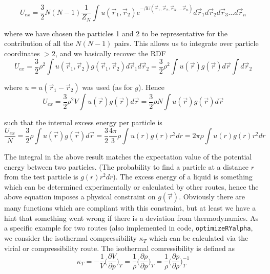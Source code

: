 \documentclass[11pt,a4paper]{article}
\begin{document}
\begin{equation}
U_{ex} = 
\frac{3}{2}
N(N-1) \frac{1}{Z_N}
\int u(\vec r_1, \vec r_2) 
e^{-\beta U(\vec r_1, \vec r_2, \vec r_3,\dots \vec r_n)} d\vec r_1 d\vec r_2 d\vec r_3 \dots d\vec r_n
\end{equation}

where we have chosen the particles 1 and 2 to be representative for the contribution of all the $N(N-1)$ pairs. This
allows us to integrate over particle coordinates $>2$, and we basically recover the RDF 
\begin{equation}
U_{ex} = \frac{3}{2}
\rho^2 \int u(\vec r_1, \vec r_2) g(\vec r_1, \vec r_2) d\vec r_1 d\vec r_2
=
\frac{3}{2}
\rho^2 \int u(\vec r) g(\vec r) d\vec r \int d\vec r_2
\end{equation}

where $u = u(\vec r_1 - \vec r_2)$ was used (as for $g$). Hence
\begin{equation}
U_{ex} = \frac{3}{2}
\rho^2 V \int u(\vec r) g(\vec r) d\vec r 
=
\frac{3}{2}
\rho N \int u(\vec r) g(\vec r) d\vec r
\end{equation}

such that the internal excess energy per particle is
\begin{equation}
\frac{U_{ex}}{N} = \frac{3}{2}
\rho  \int u(\vec r) g(\vec r) d\vec r
=
\frac{3}{2}\frac{4 \pi}{3}\rho  \int u(r) g(r) r^2 d r
=
2 \pi \rho  \int u(r) g(r) r^2 d r
\end{equation}

The integral in the above result matches the expectation value of the potential energy between two particles. 
(The probability to find a particle at a distance $r$ from the test particle is $g(r) r^2 d r$). \newline
The excess energy of a liquid is something which can be determined experimentally or calculated by other routes,
hence the above equation imposes a physical constraint on $g(\vec r) $. Obviously there are many functions which are compliant with this constraint, 
but at least we have a hint that something went wrong if there is a deviation from thermodynamics. \newline
As a specific example for two routes (also implemented in code, \texttt{optimizeRYalpha}, we consider the isothermal
compressibility $\kappa_T$ which can be calculated via the virial or compressibility route. The isothermal comressibility
is defined as
\begin{equation}
\kappa_T = - \frac{1}{V} \bigg( \frac{\partial V}{\partial p}\bigg)_T = 
\frac{1}{\rho} \bigg( \frac{\partial \rho}{\partial p}\bigg)_T =
\frac{1}{\rho} \bigg( \frac{\partial p}{\partial \rho} \bigg)_T^{-1}
\end{equation}
\end{document}
